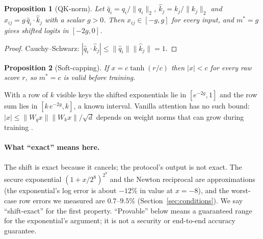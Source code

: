 \documentclass[11pt]{article}
\newtheorem{proposition}{Proposition}
\newcommand{\mstar}{m^{*}}
\begin{document}
\begin{proposition}[QK-norm]
Let $\hat q_i=q_i/\|q_i\|_2$, $\hat k_j=k_j/\|k_j\|_2$ and $x_{ij}=g\,\hat q_i\!\cdot\!\hat k_j$ with a
scalar $g>0$. Then $x_{ij}\in[-g,g]$ for every input, and $\mstar=g$ gives shifted logits in $[-2g,0]$.
\end{proposition}
\begin{proof}
Cauchy--Schwarz: $|\hat q_i\!\cdot\!\hat k_j|\le\|\hat q_i\|\|\hat k_j\|=1$.
\end{proof}
\begin{proposition}[Soft-capping]
If $x=c\tanh(r/c)$ then $|x|<c$ for every raw score $r$, so $\mstar=c$ is valid before training.
\end{proposition}
With a row of $k$ visible keys the shifted exponentials lie in $[e^{-2g},1]$ and the row sum lies in
$[k\,e^{-2g},k]$, a known interval. Vanilla attention has no such bound: $|x|\le\|W_qx\|\|W_kx\|/\sqrt d$
depends on weight norms that can grow during training \cite{zhai_entropy_2023}.

\paragraph{What ``exact'' means here.} The shift is exact because it cancels; the protocol's output is not exact.
The secure exponential $(1+x/2^8)^{2^8}$ and the Newton reciprocal are approximations (the exponential's log error is
about $-12\%$ in value at $x{=}-8$), and the worst-case row errors we measured are $0.7$--$9.5\%$ (Section~\ref{sec:conditions}).
We say ``shift-exact'' for the first property. ``Provable'' below means a guaranteed range for the exponential's
argument; it is not a security or end-to-end accuracy guarantee.
\end{document}
